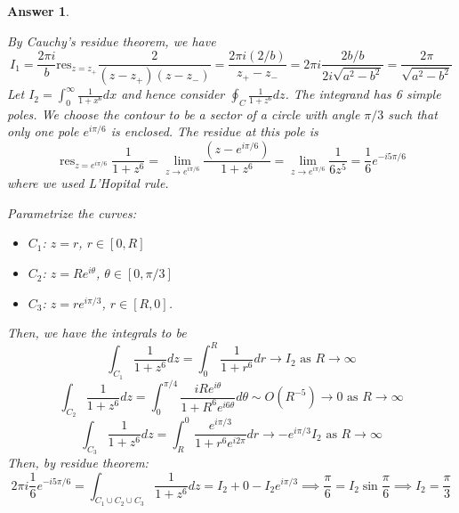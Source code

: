 \documentclass[a4paper]{article}
\DeclareMathOperator{\res}{res}
\newtheorem{ans}{Answer}[section]
\theoremstyle{new}
\begin{document}
\begin{ans}
\begin{center}
  \end{center}
By Cauchy's residue theorem, we have
$$I_1=\frac{2\pi i}{b}\text{res}_{z=z_+}\frac{2}{(z-z_+)(z-z_-)}=\frac{2\pi i (2/b)}{z_+-z_-}=2\pi i\frac{2b/b}{2i\sqrt{a^2-b^2}}=\frac{2\pi}{\sqrt{a^2-b^2}}$$
Let $I_2=\int_0^\infty\frac{1}{1+x^6}dx$ and hence consider $\oint_C\frac{1}{1+z^6}dz$. The integrand has 6 simple poles. We choose the contour to be a sector of a circle with angle $\pi/3$ such that only one pole $e^{i\pi/6}$ is enclosed. The residue at this pole is
$$\res_{z=e^{i\pi/6}}\frac{1}{1+z^6}=\lim_{z\rightarrow e^{i\pi/6}}\frac{(z-e^{i\pi/6})}{1+z^6}=\lim_{z\rightarrow e^{i\pi/6}}\frac{1}{6z^5}=\frac{1}{6}e^{-i5\pi/6}$$
where we used L'Hopital rule.
 \begin{center}
  \end{center}
Parametrize the curves: 
\begin{itemize}
    \item $C_1$: $z=r$, $r\in[0,R]$
    \item $C_2$: $z=Re^{i\theta}$, $\theta\in[0,\pi/3]$
    \item $C_3$: $z=re^{i\pi/3}$, $r\in[R,0]$.
\end{itemize}
Then, we have the integrals to be
$$\int_{C_1}\frac{1}{1+z^6}dz=\int_0^R\frac{1}{1+r^6}dr\rightarrow I_2\text{ as }R\rightarrow\infty$$
$$\int_{C_2}\frac{1}{1+z^6}dz=\int_0^{\pi/4}\frac{iRe^{i\theta}}{1+R^6e^{i6\theta}}d\theta\sim O(R^{-5})\rightarrow 0\text{ as }R\rightarrow\infty$$
$$\int_{C_3}\frac{1}{1+z^6}dz=\int_R^0\frac{e^{i\pi/3}}{1+r^6e^{i2\pi}}dr\rightarrow -e^{i\pi/3} I_2\text{ as }R\rightarrow\infty$$
Then, by residue theorem:
$$2\pi i\frac{1}{6}e^{-i5\pi/6}=\int_{C_1\cup C_2\cup C_3}\frac{1}{1+z^6}dz=I_2+0-I_2e^{i\pi/3}\implies\frac{\pi}{6}=I_2\sin\frac{\pi}{6}\implies I_2=\frac{\pi}{3}$$
\end{ans}
\newpage
\end{document}

